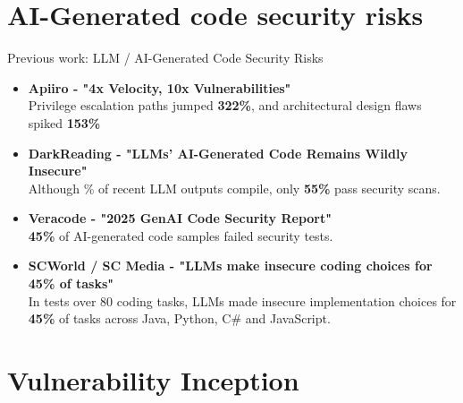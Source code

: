 \documentclass[aspectratio=169]{beamer}
\begin{document}
\section{AI-Generated code security risks}

\begin{frame}[fragile]{Previous work: LLM / AI-Generated Code Security Risks}
\begin{itemize}

  \item \textbf{Apiiro - "4x Velocity, 10x Vulnerabilities"}\\
    {\footnotesize Privilege escalation paths jumped \textbf{322\%}, and architectural design flaws spiked \textbf{153\%} }

  \item \textbf{DarkReading - "LLMs' AI-Generated Code Remains Wildly Insecure"}\\
    {\footnotesize Although \% of recent LLM outputs compile, only \textbf{55\%} pass security scans.}

  \item \textbf{Veracode - "2025 GenAI Code Security Report"}\\
    {\footnotesize \textbf{45\%} of AI-generated code samples failed security tests.}

  \item \textbf{SCWorld / SC Media - "LLMs make insecure coding choices for 45\% of tasks"}\\
    {\footnotesize In tests over 80 coding tasks, LLMs made insecure implementation choices for \textbf{45\%} of tasks across Java, Python, C\# and JavaScript.}

\end{itemize}

\end{frame}

\section{Vulnerability Inception}
\end{document}
